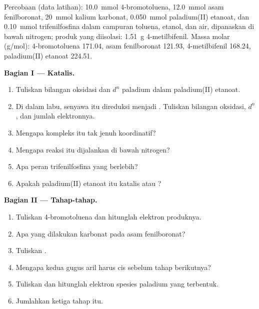\begin{problem}
\label{pb:b2:catalytic-cycles:1}
Percobaan (data latihan): \qty{10.0}{mmol} 4-bromotoluena, \qty{12.0}{mmol}
asam fenilboronat, \qty{20}{mmol} kalium karbonat, \qty{0.050}{mmol}
paladium(II) etanoat, dan \qty{0.10}{mmol} trifenilfosfina dalam campuran
toluena, etanol, dan air, dipanaskan di bawah nitrogen; produk yang
diisolasi: \qty{1.51}{g} 4-metilbifenil. Massa molar (\unit{g/mol}):
4-bromotoluena 171.04, asam fenilboronat 121.93, 4-metilbifenil
168.24, paladium(II) etanoat 224.51.

\medskip
\noindent\textbf{Bagian I --- Katalis.}
\begin{enumerate}
  \item Tuliskan bilangan oksidasi dan $d^n$ paladium dalam paladium(II) etanoat.
  \item Di dalam labu, senyawa itu direduksi menjadi . Tuliskan
        bilangan oksidasi, $d^n$, dan jumlah elektronnya.
  \item Mengapa kompleks itu tak jenuh koordinatif?
  \item Mengapa reaksi itu dijalankan di bawah nitrogen?
  \item Apa peran trifenilfosfina yang berlebih?
  \item Apakah paladium(II) etanoat itu katalis atau ?
\end{enumerate}

\medskip
\noindent\textbf{Bagian II --- Tahap-tahap.}
\begin{enumerate}[resume]
  \item Tuliskan  4-bromotoluena dan hitunglah elektron produknya.
  \item Apa yang dilakukan karbonat pada asam fenilboronat?
  \item Tuliskan .
  \item Mengapa kedua gugus aril harus cis sebelum tahap berikutnya?
  \item Tuliskan  dan hitunglah elektron spesies paladium
        yang terbentuk.
  \item Jumlahkan ketiga tahap itu.
\end{enumerate}


\end{problem}

